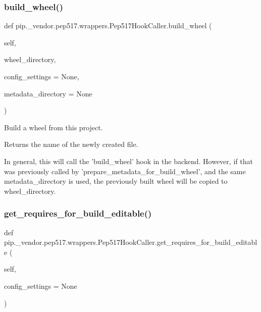 \subsubsection{\texorpdfstring{build\+\_\+wheel()}{build\_wheel()}}
{\footnotesize\ttfamily def pip.\+\_\+vendor.\+pep517.\+wrappers.\+Pep517\+Hook\+Caller.\+build\+\_\+wheel (\begin{DoxyParamCaption}\item[{}]{self,  }\item[{}]{wheel\+\_\+directory,  }\item[{}]{config\+\_\+settings = {\ttfamily None},  }\item[{}]{metadata\+\_\+directory = {\ttfamily None} }\end{DoxyParamCaption})}

\begin{DoxyVerb}Build a wheel from this project.

Returns the name of the newly created file.

In general, this will call the 'build_wheel' hook in the backend.
However, if that was previously called by
'prepare_metadata_for_build_wheel', and the same metadata_directory is
used, the previously built wheel will be copied to wheel_directory.
\end{DoxyVerb}
 \mbox{\label{classpip_1_1__vendor_1_1pep517_1_1wrappers_1_1Pep517HookCaller_a95d6f62ffabd69892c89e4708a50fc1e}} 
\subsubsection{\texorpdfstring{get\+\_\+requires\+\_\+for\+\_\+build\+\_\+editable()}{get\_requires\_for\_build\_editable()}}
{\footnotesize\ttfamily def pip.\+\_\+vendor.\+pep517.\+wrappers.\+Pep517\+Hook\+Caller.\+get\+\_\+requires\+\_\+for\+\_\+build\+\_\+editable (\begin{DoxyParamCaption}\item[{}]{self,  }\item[{}]{config\+\_\+settings = {\ttfamily None} }\end{DoxyParamCaption})}

